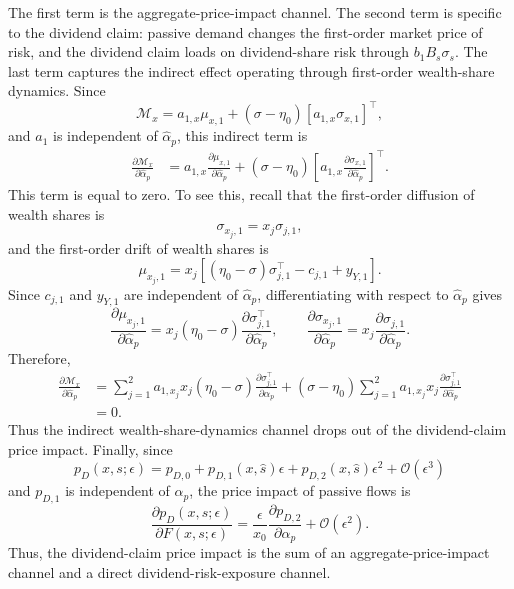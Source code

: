 The first term is the aggregate-price-impact channel.
The second term is specific to the dividend claim: passive demand changes the first-order market price of risk, and the dividend claim loads on dividend-share risk through $b_1B_s\sigma_s$.
The last term captures the indirect effect operating through first-order wealth-share dynamics.
Since
\begin{equation}
    \mathcal{M}_x
    =a_{1,x}\mu_{x,1}+ (\sigma-\eta_0)\left[a_{1,x}\sigma_{x,1}\right]^\top,
\end{equation}
and $a_1$ is independent of $\hat{\alpha}_p$, this indirect term is
%
\begin{align}
    \frac{\partial \mathcal{M}_x}{\partial \hat{\alpha}_p}
    &=a_{1,x}\frac{\partial \mu_{x,1}}{\partial \hat{\alpha}_p}
    +(\sigma-\eta_0)\left[a_{1,x}\frac{\partial \sigma_{x,1}}{\partial \hat{\alpha}_p}\right]^\top.
\end{align}
This term is equal to zero.
To see this, recall that the first-order diffusion of wealth shares is
\begin{equation}
    \sigma_{x_j,1}=x_j\sigma_{j,1},
\end{equation}
and the first-order drift of wealth shares is
\begin{equation}
    \mu_{x_j,1}=x_j\left[(\eta_0-\sigma)\sigma_{j,1}^\top-c_{j,1}+y_{Y,1}\right].
\end{equation}
Since $c_{j,1}$ and $y_{Y,1}$ are independent of $\hat{\alpha}_p$, differentiating with respect to $\hat{\alpha}_p$ gives
\begin{equation}
    \frac{\partial \mu_{x_j,1}}{\partial \hat{\alpha}_p}
    =x_j(\eta_0-\sigma)\frac{\partial \sigma_{j,1}^\top}{\partial \hat{\alpha}_p},
    \qquad
    \frac{\partial \sigma_{x_j,1}}{\partial \hat{\alpha}_p}
    =x_j\frac{\partial \sigma_{j,1}}{\partial \hat{\alpha}_p}.
\end{equation}
Therefore,
\begin{align}
    \frac{\partial \mathcal{M}_x}{\partial \hat{\alpha}_p}
    &=\sum_{j=1}^2 a_{1,x_j}x_j(\eta_0-\sigma)\frac{\partial \sigma_{j,1}^\top}{\partial \hat{\alpha}_p}
    +(\sigma-\eta_0)\sum_{j=1}^2 a_{1,x_j}x_j\frac{\partial \sigma_{j,1}^\top}{\partial \hat{\alpha}_p} \\
    &=0.
\end{align}
Thus the indirect wealth-share-dynamics channel drops out of the dividend-claim price impact.
Finally, since
\begin{equation}
    p_D(x,s;\epsilon)=p_{D,0}+p_{D,1}(x,\hat{s})\epsilon+p_{D,2}(x,\hat{s})\epsilon^2+\mathcal{O}(\epsilon^3)
\end{equation}
and $p_{D,1}$ is independent of $\hat{\alpha}_p$, the price impact of passive flows is
\begin{equation}
    \frac{\partial p_D(x,s;\epsilon)}{\partial F(x,s;\epsilon)}
    =\frac{\epsilon}{x_0}\frac{\partial p_{D,2}}{\partial \hat{\alpha}_p}
    +\mathcal{O}(\epsilon^2).
\end{equation}
Thus, the dividend-claim price impact is the sum of an aggregate-price-impact channel and a direct dividend-risk-exposure channel.


